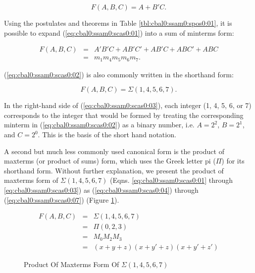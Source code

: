 \begin{equation}
\label{eq:cbal0:ssam0:scas0:01}
F(A, B, C) = A + B'C.
\end{equation}

\noindent{}Using the postulates and theorems in Table 
\ref{tbl:cbal0:ssam0:spos0:01}, it is possible
to expand (\ref{eq:cbal0:ssam0:scas0:01}) into
a sum of minterms form:

\begin{eqnarray}
\label{eq:cbal0:ssam0:scas0:02}
F(A, B, C) & = & A'B'C + AB'C' + AB'C + ABC' + ABC \\
           & = & m_1 m_4 m_5 m_6 m_7.\nonumber
\end{eqnarray}

\noindent{}(\ref{eq:cbal0:ssam0:scas0:02}) is also commonly written
in the shorthand form:

\begin{equation}
\label{eq:cbal0:ssam0:scas0:03}
F(A, B, C) = \Sigma{}(1, 4, 5, 6, 7).
\end{equation}

\noindent{}In the right-hand side of
(\ref{eq:cbal0:ssam0:scas0:03}), each integer
(1, 4, 5, 6, or 7) corresponds to the integer
that would be formed by treating the corresponding
minterm in (\ref{eq:cbal0:ssam0:scas0:02}) as
a binary number, i.e. $A=2^2$, $B=2^1$, and
$C=2^0$.  This is the basis of the short hand
notation.

A second but much less commonly used canonical form
is the product of maxterms (or product of sums) form,
which uses the Greek letter pi ($\Pi$) for its shorthand
form.  Without further explanation, we present the 
product of maxterms form of $\Sigma{}(1,4,5,6,7)$
(Eqns. \ref{eq:cbal0:ssam0:scas0:01} through
\ref{eq:cbal0:ssam0:scas0:03}) as
(\ref{eq:cbal0:ssam0:scas0:04}) 
through (\ref{eq:cbal0:ssam0:scas0:07}) 
(Figure \ref{fig:cbal0:ssam0:scas0:01}).

\begin{figure}
\begin{eqnarray}
\label{eq:cbal0:ssam0:scas0:04}
F(A, B, C) & = & \Sigma{}(1, 4, 5, 6, 7) \\
\label{eq:cbal0:ssam0:scas0:05}
           & = & \Pi{}(0, 2, 3)          \\
\label{eq:cbal0:ssam0:scas0:06}
		   & = & M_0 M_2 M_3             \\
\label{eq:cbal0:ssam0:scas0:07}
		   & = & (x+y+z)(x+y'+z)(x+y'+z')
\end{eqnarray}
\caption{Product Of Maxterms Form Of $\Sigma{}(1,4,5,6,7)$}
\label{fig:cbal0:ssam0:scas0:01}
\end{figure}


